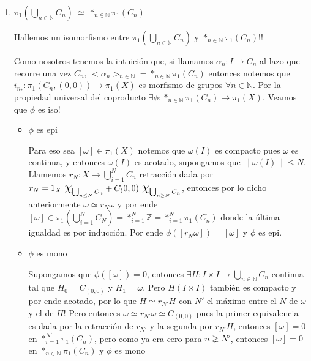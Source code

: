 \documentclass[11pt]{article}
\newcommand{\N}{{\mathbb{N}}}
\newcommand\norm[1]{\left\lVert#1\right\rVert}
\newenvironment{proof}[1][Demostraci\'on]{\begin{trivlist}
\item[\hskip \labelsep {\bfseries #1}]}{\end{trivlist}}
\newcommand{\qed}{\nobreak \ifvmode \relax \else
      \ifdim\lastskip<1.5em \hskip-\lastskip
      \hskip1.5em plus0em minus0.5em \fi \nobreak
      \vrule height0.75em width0.5em depth0.25em\fi}
\newcommand{\Z}{\mathbb{Z}}
\begin{document}
\begin{enumerate}
\begin{proof}

\begin{enumerate}

\item {$\pi_1(\bigcup_{n \in \N} {C_n}) \ \simeq \ \ast_{n \in \N}{\pi_1(C_n)}$}

Hallemos un isomorfismo entre $\pi_1(\bigcup_{n \in \N} {C_n})$ y $\ast_{n \in \N}{\pi_1(C_n)}$!! 

Como nosotros tenemos la intuici\'on que, si llamamos $\alpha_n: I \rightarrow C_n$ al lazo que recorre una vez $C_n$, $<\alpha_n>_{n \in \N} = \ast_{n \in \N} {\pi_1(C_n)}$ entonces notemos que $i_{n_*}: \pi_1(C_n,(0,0)) \rightarrow \pi_1(X)$ es morfismo de grupos $\forall n \in \N$. Por la propiedad universal del coproducto $\exists \phi: \ast_{n \in \N} {\pi_1(C_n)} \rightarrow \pi_1(X)$. Veamos que $\phi$ es iso!

\begin{itemize}

\item {$\phi$ es epi}

Para eso sea $[\omega] \in \pi_1(X)$ notemos que $\omega(I)$ es compacto pues $\omega$ es continua, y entonces $\omega(I)$ es acotado, supongamos que $\norm{\omega(I)} \leq N$. Llamemos $r_N : X \rightarrow \bigcup_{i=1}^{N}{C_n}$ retracci\'on dada por $r_N = 1_X \ \mbox{\Large$\chi$}_{\bigcup_{n \leq N}{C_n}} + C_(0,0) \ \mbox{\Large$\chi$}_{\bigcup_{n \gneq N}{C_n}}$, entonces por lo dicho anteriormente $\omega \simeq r_N \omega$ y por ende $[\omega] \in \pi_1(\bigcup_{i=1}^{N}{C_N}) = \ast_{i=1}^{N}{\Z} = \ast_{i=1}^{N} {\pi_1(C_n)}$ donde la \'ultima igualdad es por inducci\'on. Por ende $\phi ([r_N \omega]) = [\omega]$ y $\phi$ es epi.

\item {$\phi$ es mono}

Supongamos que $\phi([\omega]) = 0$, entonces $\exists H: I \times I \rightarrow \bigcup_{n \in \N}{C_n}$ continua tal que $H_0 = C_{(0,0)}$ y $H_1 = \omega$. Pero $H(I \times I)$ tambi\'en es compacto y por ende acotado, por lo que $H \simeq r_{N'} H$ con $N'$ el m\'aximo entre el $N$ de $\omega$ y el de $H$! Pero entonces $\omega \simeq r_{N'} \omega \simeq C_{(0,0)}$ pues la primer equivalencia es dada por la retracci\'on de $r_{N'}$ y la segunda por $r_{N'} H$, entonces $[\omega]=0$ en $\ast_{i=1}^{N'}{\pi_1(C_n)}$, pero como ya era cero para $n \gneq N'$, entonces $[\omega]=0$ en $\ast_{n \in \N}{\pi_1(C_n)}$ y $\phi$ es mono \qed


\end{itemize}
\end{enumerate}
\end{proof}
\end{enumerate}
\end{document}
